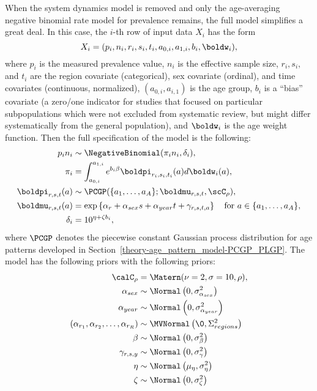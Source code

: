When the system dynamics model is removed and only the age-averaging
negative binomial rate model for prevalence remains, the full model
simplifies a great deal.  In this case, the $i$-th row of input data $X_i$
has the form 
\[
X_i = (p_i, n_i, r_i, s_i, t_i, a_{0,i}, a_{1,i}, b_i, \boldw_i),
\]
where $p_i$ is the measured prevalence value, $n_i$ is the effective
sample size, $r_i, s_i,$ and $t_i$ are the region covariate
(categorical), sex covariate (ordinal), and time covariates
(continuous, normalized), $(a_{0,i}, a_{i,1})$ is the age group, $b_i$
is a ``bias'' covariate (a zero/one indicator for studies that focused
on particular subpopulations which were not excluded from systematic
review, but might differ systematically from the general population),
and $\boldw_i$ is the age weight function.  Then the full
specification of the model is the following:
\begin{align*}
p_i n_i &\sim \NegativeBinomial(\pi_i n_i, \delta_i),\\
\pi_i &= \int_{a_{0,i}}^{a_{1,i}} e^{b_i\beta} \boldpi_{r_i,s_i,t_i}(a)d\boldw_i(a),\\
\boldpi_{r,s,t}(a) &\sim \PCGP(\{a_1, \ldots, a_A\}; \boldmu_{r,s,t}, \scC_\rho),\\
\boldmu_{r,s,t}(a) &= \exp\left\{\alpha_r + \alpha_{sex} s + \alpha_{year} t + 
\gamma_{r,s,t,a}\right\} \quad \text{for }a \in \{a_1, \ldots, a_A\},\\
\delta_i &= 10^{\eta + \zeta b_i},
\end{align*}
where $\PCGP$ denotes the piecewise constant Gaussian process
distribution for age patterns developed in
Section~\ref{theory-age_pattern_model-PCGP_PLGP}.  The model has the
following priors
with the following priors:
\begin{align*}
\calC_\rho &= \Matern(\nu=2, \sigma=10, \rho),\\
\alpha_{sex} &\sim \Normal\left(0, \sigma^2_{\alpha_{sex}}\right)\\
\alpha_{year} &\sim \Normal\left(0, \sigma^2_{\alpha_{year}}\right)\\
(\alpha_{r_1}, \alpha_{r_2}, \ldots, \alpha_{r_R}) &\sim \MVNormal\left(\0, \Sigma^2_{regions}\right)\\
\beta &\sim \Normal\left(0, \sigma_\beta^2\right)\\
\gamma_{r,s,y} &\sim \Normal\left(0, \sigma_\gamma^2\right)\\
\eta &\sim \Normal\left(\mu_\eta, \sigma_\eta^2\right)\\
\zeta &\sim \Normal\left(0, \sigma_\zeta^2\right)
\end{align*}

